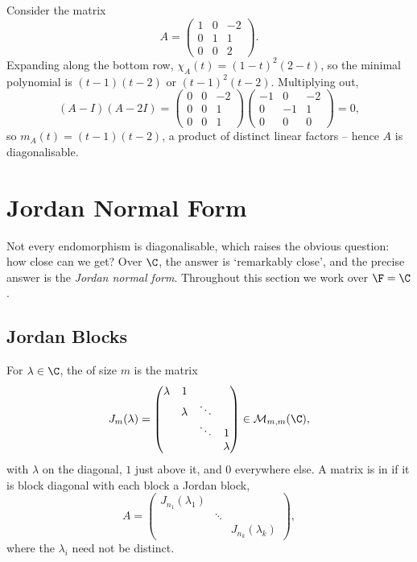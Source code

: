 \begin{example}
    Consider the matrix
    $$
    A = \begin{pmatrix}
        1 & 0 & -2 \\
        0 & 1 & 1 \\
        0 & 0 & 2
    \end{pmatrix}.
    $$
    Expanding along the bottom row, $\chi_A(t) = (1 - t)^2(2 - t)$, so the minimal polynomial is $(t-1)(t-2)$ or $(t-1)^2(t-2)$. Multiplying out,
    $$
    (A - I)(A - 2I) = \begin{pmatrix}
        0 & 0 & -2 \\ 0 & 0 & 1 \\ 0 & 0 & 1
    \end{pmatrix}\begin{pmatrix}
        -1 & 0 & -2 \\ 0 & -1 & 1 \\ 0 & 0 & 0
    \end{pmatrix} = 0,
    $$
    so $m_A(t) = (t - 1)(t- 2)$, a product of distinct linear factors -- hence $A$ is diagonalisable.
\end{example}

\section{Jordan Normal Form}

Not every endomorphism is diagonalisable, which raises the obvious question: how close can we get? Over $\C$, the answer is `remarkably close', and the precise answer is the \emph{Jordan normal form}. Throughout this section we work over $\F = \C$.

\subsection{Jordan Blocks}

\begin{definition}
    For $\lambda \in \C$, the  of size $m$ is the matrix
    $$
    J_m(\lambda) = \begin{pmatrix}
        \lambda & 1 & & \\
        & \lambda & \ddots & \\
        & & \ddots & 1 \\
        & & & \lambda
    \end{pmatrix} \in \mathcal{M}_{m,m}(\C),
    $$
    with $\lambda$ on the diagonal, $1$ just above it, and $0$ everywhere else.
    A matrix is in  if it is block diagonal with each block a Jordan block,
    $$
    A = \begin{pmatrix}
        J_{n_1}(\lambda_1) & & \\
        & \ddots & \\
        & & J_{n_k}(\lambda_k)
    \end{pmatrix},
    $$
    where the $\lambda_i$ need not be distinct.
\end{definition}

